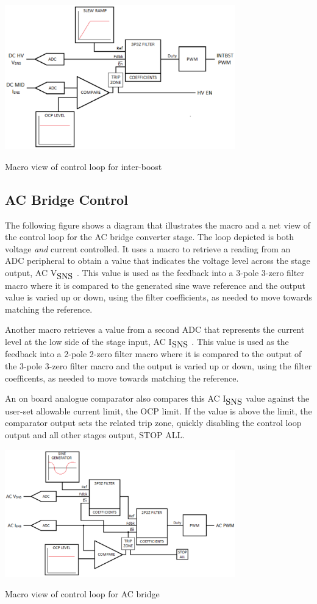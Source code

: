\begin{DoxyImage}
\includegraphics[width=10cm]{boost_xfmr_loop}
\caption{Macro view of control loop for inter-\/boost}
\end{DoxyImage}
\hypertarget{index_acbctrl}{}\subsection{A\-C Bridge Control}\label{index_acbctrl}
The following figure shows a diagram that illustrates the macro and a net view of the control loop for the A\-C bridge converter stage. The loop depicted is both voltage {\itshape and} current controlled. It uses a macro to retrieve a reading from an A\-D\-C peripheral to obtain a value that indicates the voltage level across the stage output, A\-C V$_{\mbox{S\-N\-S}}$ . This value is used as the feedback into a 3-\/pole 3-\/zero filter macro where it is compared to the generated sine wave reference and the output value is varied up or down, using the filter coefficients, as needed to move towards matching the reference.

Another macro retrieves a value from a second A\-D\-C that represents the current level at the low side of the stage input, A\-C I$_{\mbox{S\-N\-S}}$ . This value is used as the feedback into a 2-\/pole 2-\/zero filter macro where it is compared to the output of the 3-\/pole 3-\/zero filter macro and the output is varied up or down, using the filter coefficents, as needed to move towards matching the reference.

An on board analogue comparator also compares this A\-C I$_{\mbox{S\-N\-S}}$  value against the user-\/set allowable current limit, the O\-C\-P limit. If the value is above the limit, the comparator output sets the related trip zone, quickly disabling the control loop output and all other stages output, S\-T\-O\-P A\-L\-L.


\begin{DoxyImage}
\includegraphics[width=10cm]{ac_bridge_loop}
\caption{Macro view of control loop for A\-C bridge}
\end{DoxyImage}
 
